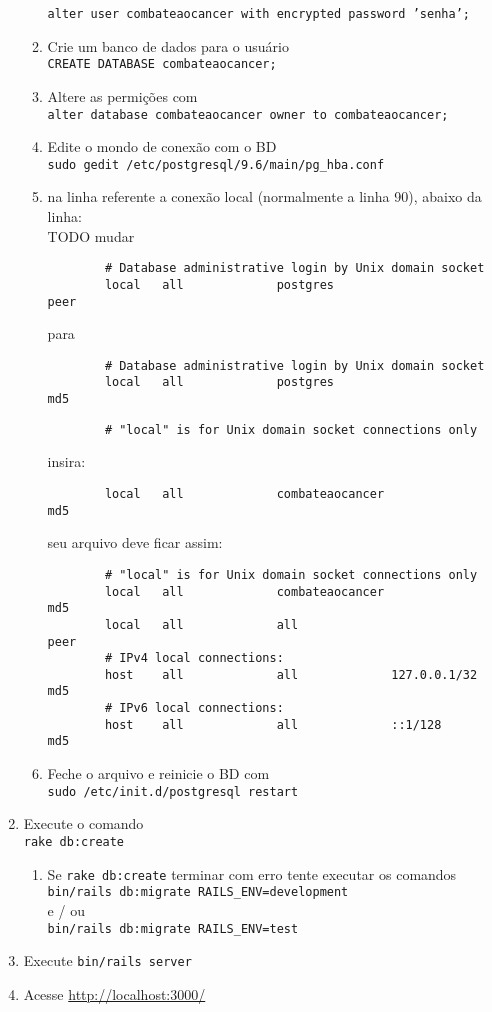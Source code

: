 \documentclass[12pt,a4paper]{article}
\begin{document}
\begin{enumerate}
\begin{enumerate}
		\texttt{alter user combateaocancer with encrypted password 'senha';}
		\item Crie um banco de dados para o usuário \\
		\texttt{CREATE DATABASE combateaocancer;}
		\item Altere as permições com\\
		\texttt{alter database combateaocancer owner to combateaocancer;}
		\item Edite o mondo de conexão com o BD\\
		\texttt{sudo gedit /etc/postgresql/9.6/main/pg\_hba.conf}
		\item na linha referente a conexão local (normalmente a linha 90), abaixo da linha:\\
		TODO mudar 
		\begin{verbatim}
		# Database administrative login by Unix domain socket
		local   all             postgres                           peer
		\end{verbatim}
		para
		\begin{verbatim}
		# Database administrative login by Unix domain socket
		local   all             postgres                           md5
		\end{verbatim}
		\begin{verbatim}
		# "local" is for Unix domain socket connections only
		\end{verbatim}
		insira:
		\begin{verbatim}
		local   all             combateaocancer                    md5
		\end{verbatim}
		seu arquivo deve ficar assim:
		\begin{verbatim}
		# "local" is for Unix domain socket connections only
		local   all             combateaocancer                    md5
		local   all             all                                peer
		# IPv4 local connections:
		host    all             all             127.0.0.1/32       md5
		# IPv6 local connections:
		host    all             all             ::1/128            md5
		\end{verbatim}
		\item Feche o arquivo e reinicie o BD com \\
		\texttt{sudo /etc/init.d/postgresql restart}
	\end{enumerate}
	\item Execute o comando\\
	\texttt{rake db:create}
	\begin{enumerate}
		\item Se \texttt{rake db:create} terminar com erro tente executar os comandos\\
		\texttt{bin/rails db:migrate RAILS\_ENV=development}\\
		e / ou\\
		\texttt{bin/rails db:migrate RAILS\_ENV=test}
	\end{enumerate}
	\item Execute \texttt{bin/rails server}
	\item Acesse \url{http://localhost:3000/}
\end{enumerate}
\end{document}
